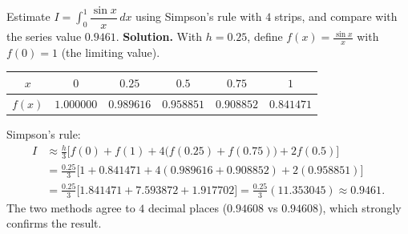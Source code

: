\documentclass[11pt]{article}
\begin{document}
\begin{exoresolu}
Estimate $\displaystyle I = \int_0^1 \dfrac{\sin x}{x}\,dx$ using Simpson's rule with $4$ strips, and compare with the series value $0.9461$.
\tcblower
\textbf{Solution.} With $h = 0.25$, define $f(x) = \frac{\sin x}{x}$ with $f(0) = 1$ (the limiting value).
\begin{center}
\begin{tabular}{|c|ccccc|}
\hline
\rowcolor{popblueL}
$x$ & $0$ & $0.25$ & $0.5$ & $0.75$ & $1$ \\
\hline
$f(x)$ & $1.000000$ & $0.989616$ & $0.958851$ & $0.908852$ & $0.841471$ \\
\hline
\end{tabular}
\end{center}
Simpson's rule:
\begin{align*}
I &\approx \frac{h}{3}\Big[ f(0) + f(1) + 4\big(f(0.25) + f(0.75)\big) + 2f(0.5) \Big]\\
&= \frac{0.25}{3}\Big[ 1 + 0.841471 + 4(0.989616 + 0.908852) + 2(0.958851) \Big]\\
&= \frac{0.25}{3}\big[ 1.841471 + 7.593872 + 1.917702 \big] = \frac{0.25}{3}(11.353045) \approx 0.9461.
\end{align*}
The two methods agree to $4$ decimal places ($0.94608$ vs $0.94608$), which strongly confirms the result.
\end{exoresolu}
\end{document}
